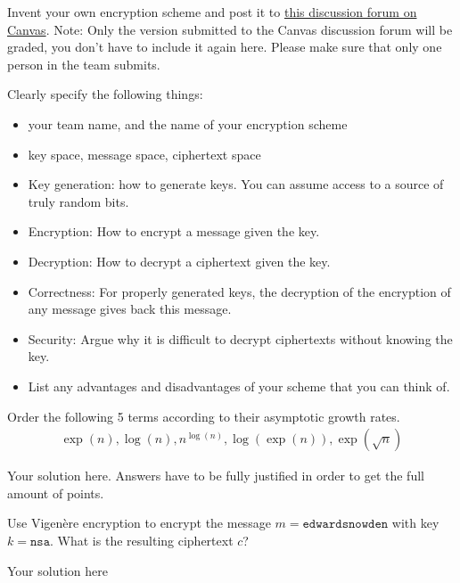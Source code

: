 \documentclass[a4paper,10pt]{article}
\begin{document}

\begin{groupproject}{10}
Invent your own encryption scheme and post it to \href{https://canvas.uva.nl/courses/10514/discussion_topics/76835?module_item_id=282332}{this discussion forum on Canvas}.
Note: Only the version submitted to the Canvas discussion forum will be graded, you don’t have to include it again here. Please make sure that only one person in the team submits.

Clearly specify the following things:
\begin{itemize}
\item your team name, and the name of your encryption scheme
\item key space, message space, ciphertext space
\item Key generation: how to generate keys. You can assume access to a source of truly random bits.
\item Encryption: How to encrypt a message given the key.
\item Decryption: How to decrypt a ciphertext given the key.
\item Correctness: For properly generated keys, the decryption of the encryption of any message gives back this message.
\item Security: Argue why it is difficult to decrypt ciphertexts without knowing the key.
\item List any advantages and disadvantages of your scheme that you can think of.
\end{itemize}
\end{groupproject}


\begin{question}{4}
Order the following 5 terms according to their asymptotic growth
rates.
\begin{align*}
\exp(n), \log(n), n^{\log(n)}, \log(\exp(n)), \exp(\sqrt{n})
\end{align*}
\end{question}

\begin{solution}
  Your solution here. Answers have to be fully justified in order to get the full amount of points.
\end{solution}

\begin{question}{2}
  Use Vigenère encryption to encrypt the message $m =
  \mathtt{edwardsnowden}$ with key $k = \mathtt{nsa}$. What is the
  resulting ciphertext $c$?
\end{question}
\begin{solution}
  Your solution here
\end{solution}
\end{document}
